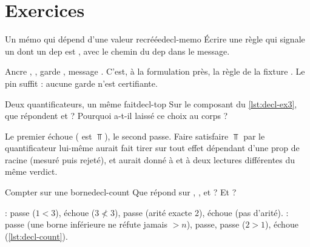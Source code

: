 \section*{Exercices}

\begin{exercice}{Un mémo qui dépend d'une valeur recréée}{decl-memo}
Écrire une règle qui signale un  dont un dep est , avec le chemin du dep dans le message.
\end{exercice}
\begin{solution}
Ancre , , garde , message . C'est, à la formulation près, la règle  de la fixture . Le pin  suffit : aucune garde n'est certifiante.
\end{solution}

\begin{exercice}{Deux quantificateurs, un même fait}{decl-top}
Sur le composant  du \cref{lst:decl-ex3}, que répondent  et  ? Pourquoi  a-t-il laissé ce choix au corps ?
\end{exercice}
\begin{solution}
Le premier échoue ( est $\Top$), le second passe. Faire satisfaire $\Top$ par le quantificateur lui-même aurait fait tirer  sur tout effet dépendant d'une prop de racine (mesuré puis rejeté), et aurait donné à  et à  deux lectures différentes du même verdict.
\end{solution}

\begin{exercice}{Compter sur une borne}{decl-count}
Que répond  sur \code{[a, ...rest]}, \code{[a, b, c, ...rest]}, \code{[a, ,]} et  ? Et  ?
\end{exercice}
\begin{solution}
 : passe ($1 < 3$), échoue ($3 \not< 3$), passe (arité exacte 2), échoue (pas d'arité).  : passe (une borne inférieure ne réfute jamais \og $> n$\fg{}), passe, passe ($2 > 1$), échoue (\cref{lst:decl-count}).
\end{solution}

